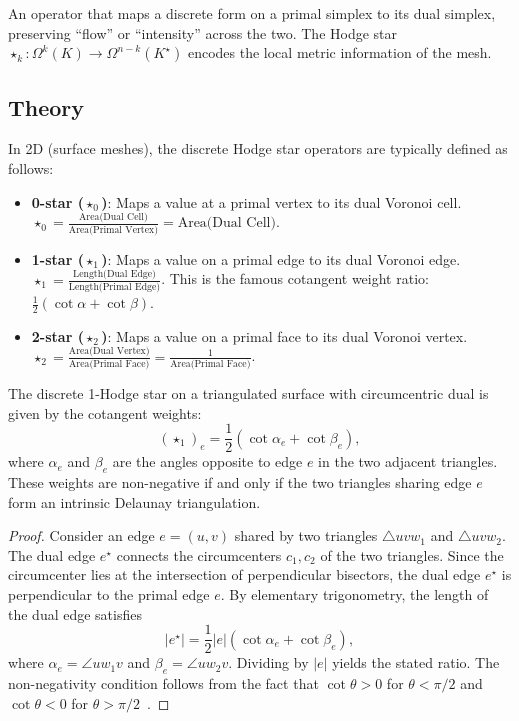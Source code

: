 \begin{definition}\label{def:hodge_star}
An operator that maps a discrete form on a primal simplex to its dual simplex, preserving ``flow'' or ``intensity'' across the two. The Hodge star $\star_k \colon \Omega^k(K) \to \Omega^{n-k}(K^\star)$ encodes the local metric information of the mesh.
\end{definition}

\subsection{Theory}
In 2D (surface meshes), the discrete Hodge star operators are typically defined as follows:
\begin{itemize}
    \item \textbf{0-star ($\star_0$)}: Maps a value at a primal vertex to its dual Voronoi cell. $\star_0 = \frac{\text{Area(Dual Cell)}}{\text{Area(Primal Vertex)}} = \text{Area(Dual Cell)}$.
    \item \textbf{1-star ($\star_1$)}: Maps a value on a primal edge to its dual Voronoi edge. $\star_1 = \frac{\text{Length(Dual Edge)}}{\text{Length(Primal Edge)}}$. This is the famous cotangent weight ratio: $\frac{1}{2}(\cot \alpha + \cot \beta)$.
    \item \textbf{2-star ($\star_2$)}: Maps a value on a primal face to its dual Voronoi vertex. $\star_2 = \frac{\text{Area(Dual Vertex)}}{\text{Area(Primal Face)}} = \frac{1}{\text{Area(Primal Face)}}$.
\end{itemize}

\begin{theorem}\label{thm:cotangent_weight}
The discrete 1-Hodge star on a triangulated surface with circumcentric dual is given by the cotangent weights:
\[
(\star_1)_{e} = \frac{1}{2}(\cot \alpha_e + \cot \beta_e),
\]
where $\alpha_e$ and $\beta_e$ are the angles opposite to edge $e$ in the two adjacent triangles. These weights are non-negative if and only if the two triangles sharing edge $e$ form an intrinsic Delaunay triangulation.
\end{theorem}

\begin{proof}
Consider an edge $e = (u,v)$ shared by two triangles $\triangle uvw_1$ and $\triangle uvw_2$. The dual edge $e^\star$ connects the circumcenters $c_1, c_2$ of the two triangles. Since the circumcenter lies at the intersection of perpendicular bisectors, the dual edge $e^\star$ is perpendicular to the primal edge $e$. By elementary trigonometry, the length of the dual edge satisfies
\[
|e^\star| = \frac{1}{2}|e|(\cot \alpha_e + \cot \beta_e),
\]
where $\alpha_e = \angle uw_1v$ and $\beta_e = \angle uw_2v$. Dividing by $|e|$ yields the stated ratio. The non-negativity condition follows from the fact that $\cot \theta > 0$ for $\theta < \pi/2$ and $\cot \theta < 0$ for $\theta > \pi/2$~\cite{pinkall1993}.
\end{proof}

